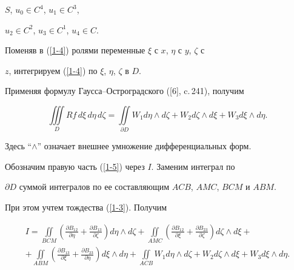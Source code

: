 $S$, $u_{0}\in C^{4}$, $u_{1}\in C^{3}$,


$u_{2}\in C^{2}$, $u_{3}\in C^{1}$, $u_{4}\in C$.





Поменяв в (\ref{1-4}) ролями переменные $\xi$ с $x$, $\eta$ с $y$, $\zeta$ с


$z$, интегрируем (\ref{1-4}) по $\xi$, $\eta$, $\zeta$ в $D$.


Применяя формулу Гаусса--Остроградского ([6], c.\,241), получим


\begin{equation}\label{1-5}


\iiint\limits_{D} Rf\,d\xi\, d\eta\, d\zeta=


\iint\limits_{\partial D} W_1 d\eta\wedge d\zeta


+W_2 d\zeta \wedge d\xi+W_3 d\xi \wedge d\eta.


\end{equation}


Здесь ``$\wedge$'' означает внешнее умножение дифференциальных форм.


Обозначим правую часть (\ref{1-5}) через $I$. Заменим интеграл по


$\partial D$ суммой интегралов по ее составляющим $ACB$, $AMC$, $BCM$ и $ABM$.


При этом учтем тождества (\ref{1-3}). Получим


\begin{gather*}


I=\iint\limits_{BCM} \left (


\frac{\partial B_{12}}{\partial \eta}


+\frac{\partial B_{13}}{\partial \zeta}  \right ) d\eta\wedge d\zeta


+\iint\limits_{AMC} \left (


\frac{\partial B_{12}}{\partial \xi}


+\frac{\partial B_{23}}{\partial \zeta} \right ) d\zeta\wedge  d\xi +\\


%


+\iint\limits_{ABM} \left (


\frac{\partial B_{13}}{\partial \xi}


+\frac{\partial B_{23}}{\partial \eta} \right ) d\xi\wedge d\eta


+\iint\limits_{ACB}  W_1 d\eta\wedge d\zeta


+W_2 d\zeta \wedge d\xi + W_3 d\xi \wedge d\eta.


\end{gather*}





